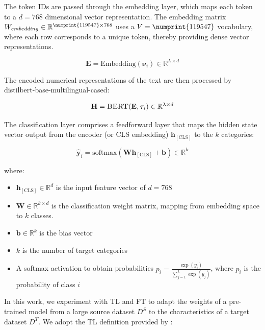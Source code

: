 \documentclass[runningheads]{llncs}
\newcommand{\modelohuggingface}{distilbert-base-multilingual-cased}
\newcommand{\bertmodel}{\textsc{BERT}}
\begin{document}
The token IDs are passed through the embedding layer, which maps each
token to a $d=768$ dimensional vector representation. The embedding
matrix $W_{embedding}\in \mathbb{R}^{\numprint{119547}\times 768}$ uses a
$V=\numprint{119547}$ vocabulary, where each row corresponds to a unique token,
thereby providing dense vector representations.

\begin{equation}\label{eq:embedding}
    \mathbf{E} = \text{Embedding}(\boldsymbol{\nu}_i) \in \mathbb{R}^{\lambda \times d}
\end{equation}

The encoded numerical representations of the text are then processed by
\modelohuggingface{}:

\begin{equation}\label{eq:encoding}
    \mathbf{H} = \bertmodel{}(\mathbf{E}, \boldsymbol{\tau}_i) \in \mathbb{R}^{\lambda \times d}
\end{equation}

The classification layer comprises a feedforward layer that maps the
hidden state vector output from the encoder (or CLS embedding)
$\mathbf{h}_{[\text{CLS}]}$ to the $k$ categories:

\begin{equation}\label{eq:classification}
  \hat{\boldsymbol{y}}_i = \text{softmax}(\mathbf{W}\mathbf{h}_{[\text{CLS}]} + \mathbf{b}) \in \mathbb{R}^k
\end{equation}

where:
\begin{itemize} 
  \item $\mathbf{h}_{[\text{CLS}]} \in \mathbb{R}^d$ is the input
    feature vector of $d=768$ 
  \item $\mathbf{W} \in \mathbb{R}^{k \times d}$ is the classification
    weight matrix, mapping from embedding space to $k$ classes.
  \item $\mathbf{b} \in \mathbb{R}^k$ is the bias vector
  \item $k$ is the number of target categories
  \item A softmax activation to obtain probabilities
    \(p_i = \frac{\exp(y_i)}{\sum_{j=1}^{k} \exp(y_j)} \), where \(
    p_i \) is the probability of class \( i \)

\end{itemize}


In this work, we experiment with TL and FT to adapt the weights of a
pre-trained model from a large source dataset $D^S$ to the
characteristics of a target dataset $D^T$. We adopt the TL definition
provided by \cite{falconi2020transfer}:
\end{document}
